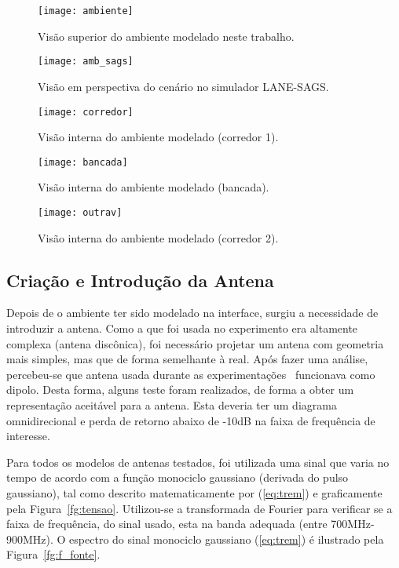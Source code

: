 \begin{figure}[!ht]
	\centering
	\texttt{[image: ambiente]}
	\caption{Visão superior do ambiente modelado neste trabalho.}
	\label{fg:ambiente}
\end{figure}
\begin{figure}[!tp]
	\centering
	\texttt{[image: amb\_sags]}
	\caption{Visão em perspectiva do cenário no simulador LANE-SAGS.}
	\label{fg:amb_sags}
\end{figure}
\begin{figure}[!ht]
	\centering
	\texttt{[image: corredor]}
	\caption{Visão interna do ambiente modelado (corredor 1).}
	\label{fg:corredor}
\end{figure}
\begin{figure}[!ht]
	\centering
	\texttt{[image: bancada]}
	\caption{Visão interna do ambiente modelado (bancada).}
	\label{fg:bancada}
\end{figure}
\begin{figure}[!ht]
	\centering
	\texttt{[image: outrav]}
	\caption{Visão interna do ambiente modelado (corredor 2).}
	\label{fg:outrav}
\end{figure}


\subsection{Criação e Introdução da Antena}

	Depois de o ambiente ter sido modelado na interface, surgiu a necessidade de introduzir a antena. Como a que foi usada no experimento era altamente complexa (antena discônica), foi necessário projetar um antena com geometria mais simples, mas que de forma semelhante à real. Após fazer uma análise, percebeu-se que antena usada durante as experimentações~\cite{fabricio} funcionava como dipolo. Desta forma, alguns teste foram realizados, de forma a obter um representação aceitável para a antena. Esta deveria ter um diagrama omnidirecional e perda de retorno abaixo de -10dB na faixa de frequência de interesse. 

	Para todos os modelos de antenas testados, foi utilizada uma sinal que varia no tempo de acordo com a função monociclo gaussiano (derivada do pulso gaussiano), tal como descrito matematicamente por (\ref{eq:trem}) e graficamente pela Figura~\ref{fg:tensao}. Utilizou-se a transformada de Fourier para verificar se a faixa de frequência, do sinal usado, esta na banda adequada (entre 700MHz-900MHz). O espectro do sinal monociclo gaussiano (\ref{eq:trem}) é ilustrado pela Figura~\ref{fg:f_fonte}.

